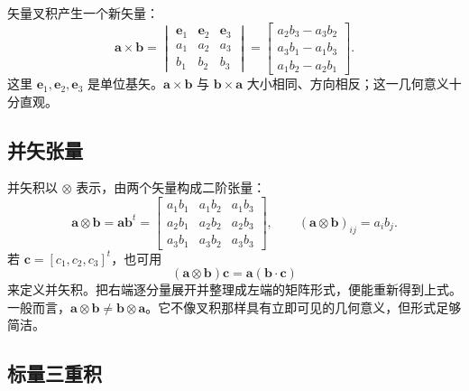 \documentclass[11pt,a4paper,openany,fontset=none]{ctexbook}
\begin{document}
矢量叉积产生一个新矢量：
\begin{equation}
 \bm a\times\bm b=
 \begin{vmatrix}\bm e_1&\bm e_2&\bm e_3\\a_1&a_2&a_3\\b_1&b_2&b_3\end{vmatrix}
 =\begin{bmatrix}a_2b_3-a_3b_2\\a_3b_1-a_1b_3\\a_1b_2-a_2b_1\end{bmatrix}. \tag{1.2.7}
\end{equation}
这里 $\bm e_1,\bm e_2,\bm e_3$ 是单位基矢。$\bm a\times\bm b$ 与 $\bm b\times\bm a$ 大小相同、方向相反；这一几何意义十分直观。

\subsection{并矢张量}

并矢积以 $\otimes$ 表示，由两个矢量构成二阶张量：
\begin{equation}
 \bm a\otimes\bm b=\bm a\bm b^t=
 \begin{bmatrix}a_1b_1&a_1b_2&a_1b_3\\a_2b_1&a_2b_2&a_2b_3\\a_3b_1&a_3b_2&a_3b_3\end{bmatrix},
 \qquad (\bm a\otimes\bm b)_{ij}=a_ib_j. \tag{1.2.8--9}
\end{equation}
若 $\bm c=[c_1,c_2,c_3]^t$，也可用
\begin{equation}
 (\bm a\otimes\bm b)\bm c=\bm a(\bm b\cdot\bm c) \tag{1.2.10}
\end{equation}
来定义并矢积。把右端逐分量展开并整理成左端的矩阵形式，便能重新得到上式。一般而言，$\bm a\otimes\bm b\ne\bm b\otimes\bm a$。它不像叉积那样具有立即可见的几何意义，但形式足够简洁。

\subsection{标量三重积}
\end{document}
